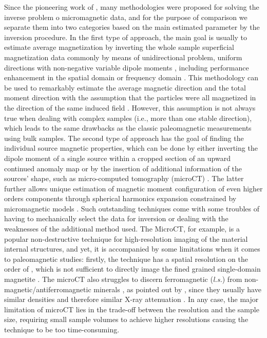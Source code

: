 \DIFdelend Since the pioneering work of \cite{Egli2000}, many methodologies were proposed for solving the inverse problem o micromagnetic data, and for the purpose of comparison we separate them into two categories based on the main estimated parameter by the inversion procedure.
In the first type of approach, the main goal is usually to estimate average magnetization by inverting the whole sample superficial magnetization data commonly by means of unidirectional problem, uniform directions with non-negative variable dipole moments \citep[e.g.,][]{Weiss2007}, including performance enhancement in the spatial domain \citep[e.g.,][]{Myre2019} or frequency domain  \citep[e.g.,][]{Lima2013}.
This methodology can be used to remarkably estimate the average magnetic direction and the total moment direction with the assumption that the particles were all magnetized in the direction of the same induced field \citep[sIRM and/or NRM in basalts,][]{Weiss2007}.
However, this assumption is not always true when dealing with complex samples (i.e., more than one stable direction), which leads to the same drawbacks as the classic paleomagnetic measurements using bulk samples.
The second type of approach has the goal of finding the individual source magnetic properties, which can be done by either inverting the dipole moment of a single source within a cropped section of an upward continued anomaly map \citep[e.g.,][]{Lima2016, Fu2020} or by the insertion of additional information of the sources’ shape, such as micro-computed tomography (microCT) \DIFdelbegin {}\DIFdelend \DIFaddbegin {}\DIFaddend .
The latter further allows unique estimation of magnetic moment configuration of even higher orders components through spherical harmonics expansion constrained by micromagnetic models \citep[e.g.,][]{CortesOrtuno2021, CortesOrtuno2022}.
Such outstanding techniques come with some troubles of having to mechanically select the data for inversion or dealing with the weaknesses of the additional method used.
The MicroCT, for example, is a popular non-destructive technique for high-resolution imaging of the material internal structures, and yet, it is accompanied by some limitations when it comes to paleomagnetic studies: firstly, the technique has a spatial resolution on the order of \DIFdelbegin {}\DIFdelend \DIFaddbegin {}\DIFaddend , which is not sufficient to directly image the fined grained single-domain magnetite \citep{DeGroot2018}.
The microCT also struggles to discern ferromagnetic (\textit{l.s.}) from non-magnetic/antiferromagnetic minerals \DIFaddbegin {}\DIFaddend , as pointed out by \cite{DeGroot2021}, since they usually have similar densities and therefore similar X-ray attenuation \citep{Cnudde2013}.
In any case, the major limitation of microCT lies in the trade-off between the resolution and the sample size, requiring small sample volumes to achieve higher resolutions causing the technique to be too time-consuming.



